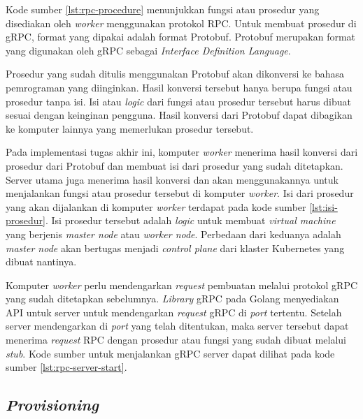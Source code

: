 Kode sumber \ref{lst:rpc-procedure} menunjukkan fungsi atau prosedur
yang disediakan oleh \emph{worker} menggunakan protokol RPC. Untuk membuat prosedur
di gRPC, format yang dipakai adalah format Protobuf. Protobuf merupakan format
yang digunakan oleh gRPC sebagai \emph{Interface Definition Language}.

Prosedur yang sudah ditulis menggunakan Protobuf akan dikonversi
ke bahasa pemrograman yang diinginkan. Hasil konversi tersebut hanya
berupa fungsi atau prosedur tanpa isi. Isi atau \emph{logic} dari fungsi atau prosedur
tersebut harus dibuat sesuai dengan keinginan pengguna. Hasil konversi dari Protobuf
dapat dibagikan ke komputer lainnya yang memerlukan prosedur tersebut. 

Pada implementasi tugas akhir ini, komputer \emph{worker} menerima
hasil konversi dari prosedur dari Protobuf dan membuat isi dari
prosedur yang sudah ditetapkan. Server utama juga menerima hasil konversi
dan akan menggunakannya untuk menjalankan fungsi atau prosedur tersebut di komputer
\emph{worker}. Isi dari prosedur yang akan dijalankan di komputer \emph{worker} terdapat
pada kode sumber \ref{lst:isi-prosedur}. Isi prosedur tersebut adalah \emph{logic}
untuk membuat \emph{virtual machine} yang berjenis \emph{master node} atau \emph{worker node}.
Perbedaan dari keduanya adalah \emph{master node} akan bertugas menjadi \emph{control plane}
dari klaster Kubernetes yang dibuat nantinya.

\clearpage



Komputer \emph{worker} perlu mendengarkan \emph{request} pembuatan melalui
protokol gRPC yang sudah ditetapkan sebelumnya. \emph{Library} gRPC pada Golang
menyediakan API untuk server untuk mendengarkan \emph{request} gRPC di \emph{port}
tertentu. Setelah server mendengarkan di \emph{port} yang telah ditentukan, maka
server tersebut dapat menerima \emph{request} RPC dengan prosedur atau fungsi
yang sudah dibuat melalui \emph{stub}. Kode sumber untuk menjalankan
gRPC server dapat dilihat pada kode sumber \ref{lst:rpc-server-start}.



\subsection{\emph{Provisioning}}
\label{sec:provisioning}

